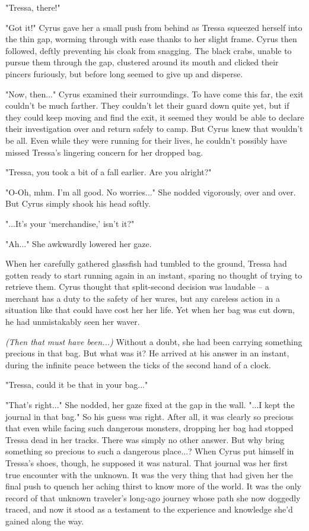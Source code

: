 "Tressa, there!"

"Got it!" Cyrus gave her a small push from behind as Tressa squeezed herself into the thin gap, worming through with ease thanks to her slight frame. Cyrus then followed, deftly preventing his cloak from snagging. The black crabs, unable to pursue them through the gap, clustered around its mouth and clicked their pincers furiously, but before long seemed to give up and disperse.

"Now, then..." Cyrus examined their surroundings. To have come this far, the exit couldn't be much farther. They couldn't let their guard down quite yet, but if they could keep moving and find the exit, it seemed they would be able to declare their investigation over and return safely to camp. But Cyrus knew that wouldn't be all. Even while they were running for their lives, he couldn't possibly have missed Tressa's lingering concern for her dropped bag.

"Tressa, you took a bit of a fall earlier. Are you alright?"

"O-Oh, mhm. I'm all good. No worries..." She nodded vigorously, over and over. But Cyrus simply shook his head softly.

"...It's your `merchandise,' isn't it?"

"Ah..." She awkwardly lowered her gaze.

When her carefully gathered glassfish had tumbled to the ground, Tressa had gotten ready to start running again in an instant, sparing no thought of trying to retrieve them. Cyrus thought that split-second decision was laudable -- a merchant has a duty to the safety of her wares, but any careless action in a situation like that could have cost her her life. Yet when her bag was cut down, he had unmistakably seen her waver. 

\emph{(Then that must have been...)} Without a doubt, she had been carrying something precious in that bag. But what was it? He arrived at his answer in an instant, during the infinite peace between the ticks of the second hand of a clock.

"Tressa, could it be that in your bag..."

"That's right..." She nodded, her gaze fixed at the gap in the wall. "...I kept the journal in that bag." So his guess was right. After all, it was clearly so precious that even while facing such dangerous monsters, dropping her bag had stopped Tressa dead in her tracks. There was simply no other answer. But why bring something so precious to such a dangerous place...? When Cyrus put himself in Tressa's shoes, though, he supposed it was natural. That journal was her first true encounter with the unknown. It was the very thing that had given her the final push to quench her aching thirst to know more of the world. It was the only record of that unknown traveler's long-ago journey whose path she now doggedly traced, and now it stood as a testament to the experience and knowledge she'd gained along the way.

